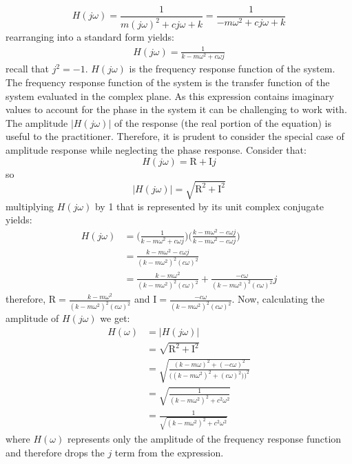 \documentclass[12pt,letter]{article}
\begin{document}
\begin{equation}
H(j\omega) = \frac{1}{m(j\omega)^2+cj\omega+k} = \frac{1}{-m\omega^2+cj\omega+k} 
\end{equation}
rearranging into a standard form yields:
\begin{eqnarray}
H(j\omega) = \frac{1}{k-m\omega^2+c\omega j}
\label{eq:frequency_response_function}
\end{eqnarray}
recall that $j^2=-1$. $H(j\omega)$ is the frequency response function of the system. The frequency response function of the system is the transfer function of the system evaluated in the complex plane. As this expression contains imaginary values to account for the phase in the system it can be challenging to work with. The amplitude $|H(j\omega)|$ of the response (the real portion of the equation) is useful to the practitioner. Therefore, it is prudent to consider the special case of amplitude response while neglecting the phase response. Consider that:
\begin{equation}
	H(j\omega) = \text{R}+\text{I}j
\end{equation}  
so
\begin{equation}
	 |H(j\omega)|=\sqrt{\text{R}^2+\text{I}^2}
\end{equation}  
multiplying $H(j\omega)$ by 1 that is represented by its unit complex conjugate yields:
\begin{align}
H(j\omega) &= \bigg( \frac{1}{k-m\omega^2+c\omega j} \bigg) \bigg( \frac{k-m\omega^2-c\omega j}{k-m\omega^2-c\omega j}\bigg) \\
&= \frac{k-m\omega^2-c\omega j}{(k-m\omega^2)^2(c\omega)^2}  \\
&=  \frac{k-m\omega^2}{(k-m\omega^2)^2(c\omega)^2}  +  \frac{-c\omega}{(k-m\omega^2)^2(c\omega)^2}j 
\end{align}
therefore, $\text{R} = \frac{k-m\omega^2}{(k-m\omega^2)^2(c\omega)^2} $ and $\text{I} = \frac{-c\omega}{(k-m\omega^2)^2(c\omega)^2}$. Now, calculating the amplitude of $H(j\omega)$ we get:
\begin{align}
H(\omega) &= |H(j\omega)| \\
&=  \sqrt{\text{R}^2+\text{I}^2} \\
&=  \sqrt{\frac{(k-m\omega)^2+(-c\omega)^2}{\big((k-m\omega^2)^2+(c\omega)^2)\big)^2}} \\
&=  \sqrt{\frac{1}{(k-m\omega^2)^2+c^2\omega^2}} \\
&= \frac{1}{\sqrt{(k-m\omega^2)^2+c^2\omega^2}}
\end{align}
where $H(\omega)$ represents only the amplitude of the frequency response function and therefore drops the $j$ term from the expression. 
\end{document}
